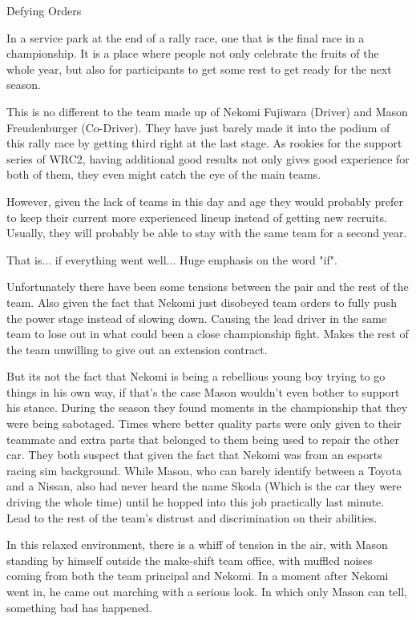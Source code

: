 \h{Defying Orders}

In a service park at the end of a rally race, one that is the final race in a championship. It is a place where people not only celebrate the fruits of the whole year, but also for participants to get some rest to get ready for the next season.

This is no different to the team made up of Nekomi Fujiwara (Driver) and Mason Freudenburger (Co-Driver). They have just barely made it into the podium of this rally race by getting third right at the last stage. As rookies for the support series of WRC2, having additional good results not only gives good experience for both of them, they even might catch the eye of the main teams.

However, given the lack of teams in this day and age they would probably prefer to keep their current more experienced lineup instead of getting new recruits. Usually, they will probably be able to stay with the same team for a second year. 

That is... if everything went well... Huge emphasis on the word "if". 

Unfortunately there have been some tensions between the pair and the rest of the team. Also given the fact that Nekomi just disobeyed team orders to fully push the power stage instead of slowing down. Causing the lead driver in the same team to lose out in what could been a close championship fight. Makes the rest of the team unwilling to give out an extension contract.

But its not the fact that Nekomi is being a rebellious young boy trying to go things in his own way, if that's the case Mason wouldn't even bother to support his stance. During the season they found moments in the championship that they were being sabotaged. Times where better quality parts were only given to their teammate and extra parts that belonged to them being used to repair the other car. They both suspect that given the fact that Nekomi was from an esports racing sim background. While Mason, who can barely identify between a Toyota and a Nissan, also had never heard the name Skoda (Which is the car they were driving the whole time) until he hopped into this job practically last minute. Lead to the rest of the team's distrust and discrimination on their abilities. 

In this relaxed environment, there is a whiff of tension in the air, with Mason standing by himself outside the make-shift team office, with muffled noises coming from both the team principal and Nekomi. In a moment after Nekomi went in, he came out marching with a serious look. In which only Mason can tell, something bad has happened. 

